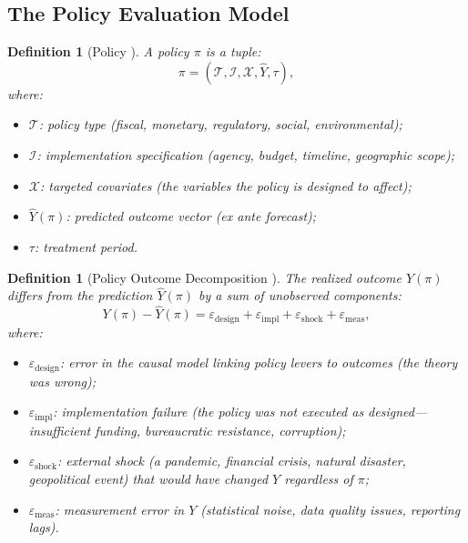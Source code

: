 \documentclass[11pt,a4paper]{article}
\newtheorem{definition}[theorem]{Definition}
\theoremstyle{definition}
\begin{document}
\subsection{The Policy Evaluation Model}
\begin{definition}[Policy ]
\label{def:policy}
A policy $\pi$ is a tuple:
\begin{equation}
    \pi = (\mathcal{T}, \mathcal{I}, \mathcal{X}, \hat{Y}, \tau),
    \label{eq:policy}
\end{equation}
where:
\begin{itemize}
    \item $\mathcal{T}$: policy type (fiscal, monetary, regulatory, social, environmental);
    \item $\mathcal{I}$: implementation specification (agency, budget, timeline, geographic scope);
    \item $\mathcal{X}$: targeted covariates (the variables the policy is designed to affect);
    \item $\hat{Y}(\pi)$: predicted outcome vector (ex ante forecast);
    \item $\tau$: treatment period.
\end{itemize}
\end{definition}
\begin{definition}[Policy Outcome Decomposition ]
\label{def:outcome_decomp}
The realized outcome $Y(\pi)$ differs from the prediction $\hat{Y}(\pi)$ by a sum of unobserved components:
\begin{equation}
    Y(\pi) - \hat{Y}(\pi) = \varepsilon_{\mathrm{design}} + \varepsilon_{\mathrm{impl}} + \varepsilon_{\mathrm{shock}} + \varepsilon_{\mathrm{meas}},
    \label{eq:outcome_decomp}
\end{equation}
where:
\begin{itemize}
    \item $\varepsilon_{\mathrm{design}}$: error in the causal model linking policy levers to outcomes (the theory was wrong);
    \item $\varepsilon_{\mathrm{impl}}$: implementation failure (the policy was not executed as designed---insufficient funding, bureaucratic resistance, corruption);
    \item $\varepsilon_{\mathrm{shock}}$: external shock (a pandemic, financial crisis, natural disaster, geopolitical event) that would have changed $Y$ regardless of $\pi$;
    \item $\varepsilon_{\mathrm{meas}}$: measurement error in $Y$ (statistical noise, data quality issues, reporting lags).
\end{itemize}
\end{definition}
\end{document}
